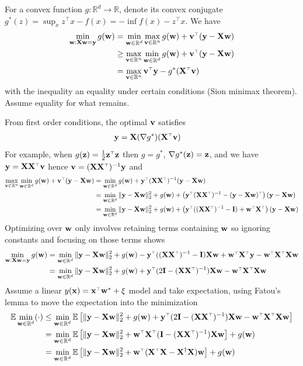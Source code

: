 \documentclass[11pt]{article}
\begin{document}
For a convex function $g : \mathbb{R}^d \to \mathbb{R}$, denote its convex
conjugate $g^*(z) = \sup_x z^\top x - f(x) = -\inf f(x) - z^\top x$. We have
\begin{align*}
  \min_{\w : \X \w = \y} g(\w)
  &= \min_{\w \in \mathbb{R}^d} \max_{\v \in \mathbb{R}^n} g(\w) + \v^\top (\y - \X \w) \\
  &\geq \max_{\v \in \mathbb{R}^n} \min_{\w \in \mathbb{R}^d} g(\w) + \v^\top (\y - \X \w) \\
  &= \max_{\v \in \mathbb{R}^n} \v^\top \y - g^*(\X^\top \v)
\end{align*}
with the inequality an equality under certain conditions (Sion minimax theorem).
Assume equality for what remains.

From first order conditions, the optimal $\mathbf v$ satisfies
\begin{align*}
  \y &= \X (\nabla g^*)(\X^\top \v)
\end{align*}
For example, when $g(\z) = \frac{1}{2} \z^\top \z$ then $g = g^*$, $\nabla g^*(\mathbf z) = \mathbf z$,
and we have $\y = \X \X^\top \v$ hence $\v = (\X \X^\top)^{-1} \y$ and
\begin{align*}
  \max_{\v \in \mathbb{R}^n} \min_{\w \in \mathbb{R}^d} g(\w) + \v^\top (\y - \X \w)
  &= \min_{\w \in \mathbb{R}^d} g(\w) + \y^\top (\X \X^\top)^{-1} (\y - \X \w) \\
  &= \min_{\w \in \mathbb{R}^d} \|\y - \X \w\|_2^2 + g(\w) + \left(\y^\top (\X \X^\top)^{-1} - (\y - \X \w)^\top\right) (\y - \X \w) \\
  &= \min_{\w \in \mathbb{R}^d} \|\y - \X \w\|_2^2 + g(\w) + \left(
    \y^\top ((\X \X^\top)^{-1} - \I) + \w^\top \X^\top
  \right) (\y - \X \w)
\end{align*}
Optimizing over $\mathbf w$ only involves retaining terms containing $\mathbf w$ so
ignoring constants and focusing on those terms shows
\begin{align*}
  \min_{\w : \X \w = \y} g(\w)
  &= \min_{\w \in \mathbb{R}^d} \|\y - \X \w\|_2^2 + g(\w)
    - \y^\top ((\X \X^\top)^{-1} - \I) \X \w + \w^\top \X^\top \y - \w^\top \X^\top \X \w \\
  &= \min_{\w \in \mathbb{R}^d} \|\y - \X \w\|_2^2 + g(\w)
    + \y^\top (2 \I - (\X \X^\top)^{-1}) \X \w
    - \w^\top \X^\top \X \w
\end{align*}
Assume a linear $y(\x) = \x^\top \w^* + \xi$ model and take expectation,
using Fatou's lemma to move the expectation into the minimization
\begin{align*}
  \E \min_{\w \in \mathbb{R}^d} (\cdot)
  &\leq \min_{\w \in \mathbb{R}^d} \E\left[
    \|\y - \X \w\|_2^2 + g(\w)
    + \y^\top (2 \I - (\X \X^\top)^{-1}) \X \w
    - \w^\top \X^\top \X \w
  \right] \\
  &= \min_{\w \in \mathbb{R}^d} \E\left[
    \|\y - \X \w\|_2^2
    + \w^\top \X^\top (\I - (\X \X^\top)^{-1}) \X \w
  \right]
  + g(\w) \\
  &= \min_{\w \in \mathbb{R}^d} \E\left[
    \|\y - \X \w\|_2^2
    + \w^\top (\X^\top \X - \X^\dag \X) \w
  \right]
  + g(\w)
\end{align*}
\end{document}
